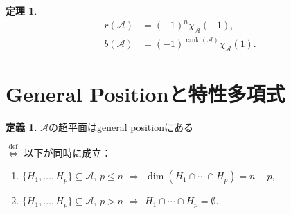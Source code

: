 \documentclass[xelatex,ja=standard,a4paper,14pt,everyparhook=compat]{bxjsarticle}
\newcommand{\mcA}{\mathcal{A}}
\DeclareMathOperator{\rank}{rank}
\theoremstyle{definition}
\newtheorem*{theorem}{定理}
\newtheorem*{definition}{定義}
\begin{document}
\begin{theorem}
    \begin{align*}
        r(\mcA) & = (-1)^n \chi_\mcA(-1),            \\
        b(\mcA) & = (-1)^{\rank(\mcA)} \chi_\mcA(1).
    \end{align*}
\end{theorem}

\section{General Positionと特性多項式}

\begin{definition}
    $\mcA$の超平面はgeneral positionにある

    $\overset{\mathrm{def}}{\iff}$ 以下が同時に成立： \begin{enumerate}
        \item $\{H_1,\ldots,H_p\} \subseteq \mcA$, $p \leq n$ $\Longrightarrow$ $\dim(H_1 \cap \cdots \cap H_p) = n-p$,
        \item $\{H_1,\ldots,H_p\} \subseteq \mcA$, $p > n$ $\Longrightarrow$ $H_1 \cap \cdots \cap H_p = \emptyset$.
    \end{enumerate}
\end{definition}
\end{document}
